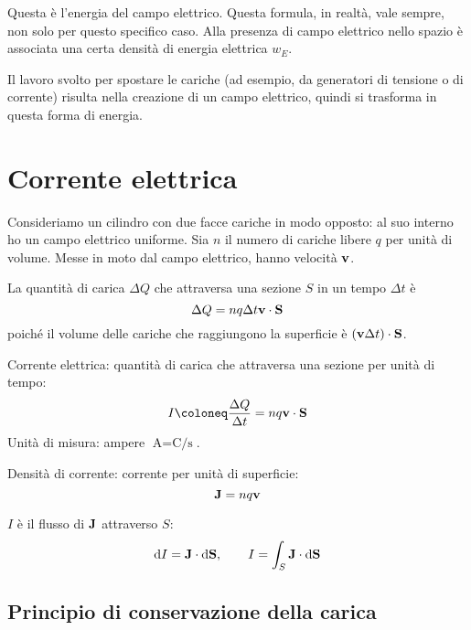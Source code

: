 Questa è l'energia del campo elettrico.
Questa formula, in realtà, vale sempre, non solo per questo specifico caso.
Alla presenza di campo elettrico nello spazio è associata una certa densità di energia elettrica $w_E$.

Il lavoro svolto per spostare le cariche (ad esempio, da generatori di tensione o di corrente) risulta nella creazione di un campo elettrico, quindi si trasforma in questa forma di energia.

\section{Corrente elettrica}

Consideriamo un cilindro con due facce cariche in modo opposto: al suo interno ho un campo elettrico uniforme.
Sia $n$ il numero di cariche libere $q$ per unità di volume.
Messe in moto dal campo elettrico, hanno velocità $\mathbf{v}$.


La quantità di carica $\Delta Q$ che attraversa una sezione $S$ in un tempo $\Delta t$ è
\begin{equation}
    \Delta Q = n q \Delta t \mathbf{v} \cdot \mathbf{S}
\end{equation}
poiché il volume delle cariche che raggiungono la superficie è $(\mathbf{v}\Delta t) \cdot \mathbf{S}$.

Corrente elettrica: quantità di carica che attraversa una sezione per unità di tempo:
\begin{equation}
    I \coloneq \frac{\Delta Q}{\Delta t} = nq\vt{v} \cdot \vt{S}
\end{equation}
Unità di misura: ampere $\unit{\ampere} = \unit{\coulomb\per\second}$.

Densità di corrente: corrente per unità di superficie:
\begin{equation}
    \mathbf{J} = nq\mathbf{v}
\end{equation}

$I$ è il flusso di $\mathbf{J}$ attraverso $S$:
\begin{equation}
    \mathrm{d} I = \mathbf{J} \cdot \mathrm{d} \mathbf{S}, \qquad I = \int_S \mathbf{J} \cdot \mathrm{d} \mathbf{S}
\end{equation}

\subsection{Principio di conservazione della carica}

